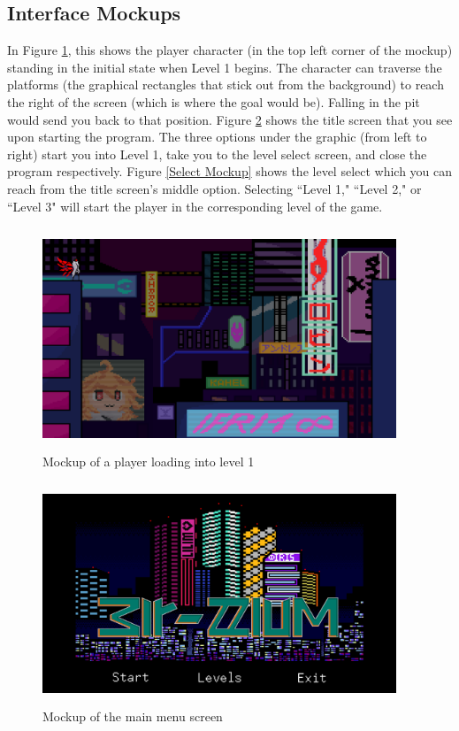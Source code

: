 \documentclass[10pt,conference,onecolumn,compsoc]{IEEEtran}
\begin{document}
\subsection{Interface Mockups}
In Figure \ref{Level1 Mockup}, this shows the player character (in the top left corner of the mockup) standing in the initial state when Level 1 begins. The character can traverse the platforms (the graphical rectangles that stick out from the background) to reach the right of the screen (which is where the goal would be). Falling in the pit would send you back to that position.
Figure \ref{Start Mockup} shows the title screen that you see upon starting the program. The three options under the graphic (from left to right) start you into Level 1, take you to the level select screen, and close the program respectively.
Figure \ref{Select Mockup} shows the level select which you can reach from the title screen's middle option. Selecting ``Level 1," ``Level 2," or ``Level 3" will start the player in the corresponding level of the game.
\begin{figure}[ht!]
\includegraphics[height=250px, width=400px]{Level1 Mockup.png}
\caption{Mockup of a player loading into level 1}
\label{Level1 Mockup}
\end{figure}

\begin{figure}[ht!]
\includegraphics[height=250px, width=400px]{Start Mockup.png}
\caption{Mockup of the main menu screen}
\label{Start Mockup}
\end{figure}
\end{document}
